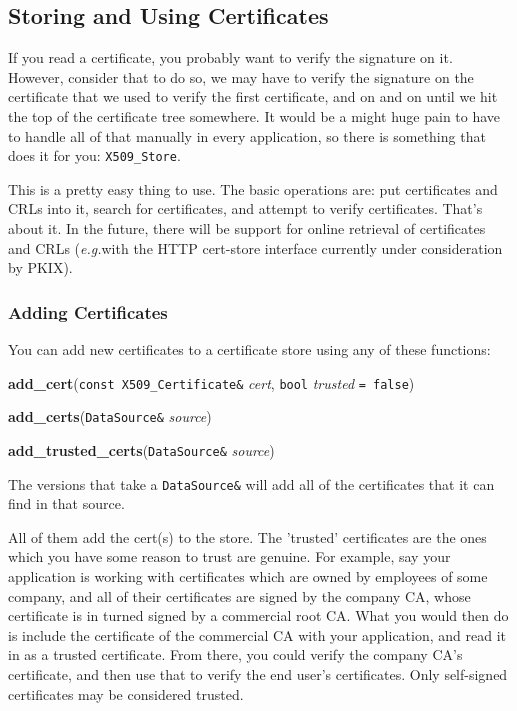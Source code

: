 \documentclass{article}
\newcommand{\function}[1]{\textbf{#1}}
\newcommand{\type}[1]{\texttt{#1}}
\renewcommand{\arg}[1]{\textsl{#1}}
\newcommand{\eg}[0]{\emph{e.g.}}
\begin{document}
\subsection{Storing and Using Certificates}

If you read a certificate, you probably want to verify the signature on
it. However, consider that to do so, we may have to verify the signature on the
certificate that we used to verify the first certificate, and on and on until
we hit the top of the certificate tree somewhere. It would be a might huge pain
to have to handle all of that manually in every application, so there is
something that does it for you: \type{X509\_Store}.

This is a pretty easy thing to use. The basic operations are: put certificates
and CRLs into it, search for certificates, and attempt to verify
certificates. That's about it. In the future, there will be support for online
retrieval of certificates and CRLs (\eg with the HTTP cert-store interface
currently under consideration by PKIX).

\subsubsection{Adding Certificates}

You can add new certificates to a certificate store using any of these
functions:

\function{add\_cert}(\type{const X509\_Certificate\&} \arg{cert},
                     \type{bool} \arg{trusted} \type{= false})

\function{add\_certs}(\type{DataSource\&} \arg{source})

\function{add\_trusted\_certs}(\type{DataSource\&} \arg{source})

The versions that take a \type{DataSource\&} will add all of the certificates
that it can find in that source.

All of them add the cert(s) to the store. The 'trusted' certificates are the
ones which you have some reason to trust are genuine. For example, say your
application is working with certificates which are owned by employees of some
company, and all of their certificates are signed by the company CA, whose
certificate is in turned signed by a commercial root CA. What you would then do
is include the certificate of the commercial CA with your application, and read
it in as a trusted certificate. From there, you could verify the company CA's
certificate, and then use that to verify the end user's certificates. Only
self-signed certificates may be considered trusted.
\end{document}
